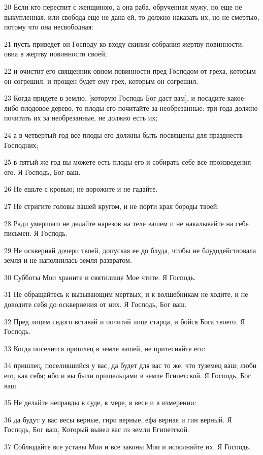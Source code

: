 \par 20 Если кто переспит с женщиною, а она раба, обрученная мужу, но еще не выкупленная, или свобода еще не дана ей, то должно наказать их, но не смертью, потому что она несвободная:
\par 21 пусть приведет он Господу ко входу скинии собрания жертву повинности, овна в жертву повинности своей;
\par 22 и очистит его священник овном повинности пред Господом от греха, которым он согрешил, и прощен будет ему грех, которым он согрешил.
\par 23 Когда придете в землю, [которую Господь Бог даст вам], и посадите какое-либо плодовое дерево, то плоды его почитайте за необрезанные: три года должно почитать их за необрезанные, не должно есть их;
\par 24 а в четвертый год все плоды его должны быть посвящены для празднеств Господних;
\par 25 в пятый же год вы можете есть плоды его и собирать себе все произведения его. Я Господь, Бог ваш.
\par 26 Не ешьте с кровью; не ворожите и не гадайте.
\par 27 Не стригите головы вашей кругом, и не порти края бороды твоей.
\par 28 Ради умершего не делайте нарезов на теле вашем и не накалывайте на себе письмен. Я Господь.
\par 29 Не оскверняй дочери твоей, допуская ее до блуда, чтобы не блудодействовала земля и не наполнилась земля развратом.
\par 30 Субботы Мои храните и святилище Мое чтите. Я Господь.
\par 31 Не обращайтесь к вызывающим мертвых, и к волшебникам не ходите, и не доводите себя до осквернения от них. Я Господь, Бог ваш.
\par 32 Пред лицем седого вставай и почитай лице старца, и бойся Бога твоего. Я Господь.
\par 33 Когда поселится пришлец в земле вашей, не притесняйте его:
\par 34 пришлец, поселившийся у вас, да будет для вас то же, что туземец ваш; люби его, как себя; ибо и вы были пришельцами в земле Египетской. Я Господь, Бог ваш.
\par 35 Не делайте неправды в суде, в мере, в весе и в измерении:
\par 36 да будут у вас весы верные, гири верные, ефа верная и гин верный. Я Господь, Бог ваш, Который вывел вас из земли Египетской.
\par 37 Соблюдайте все уставы Мои и все законы Мои и исполняйте их. Я Господь.

